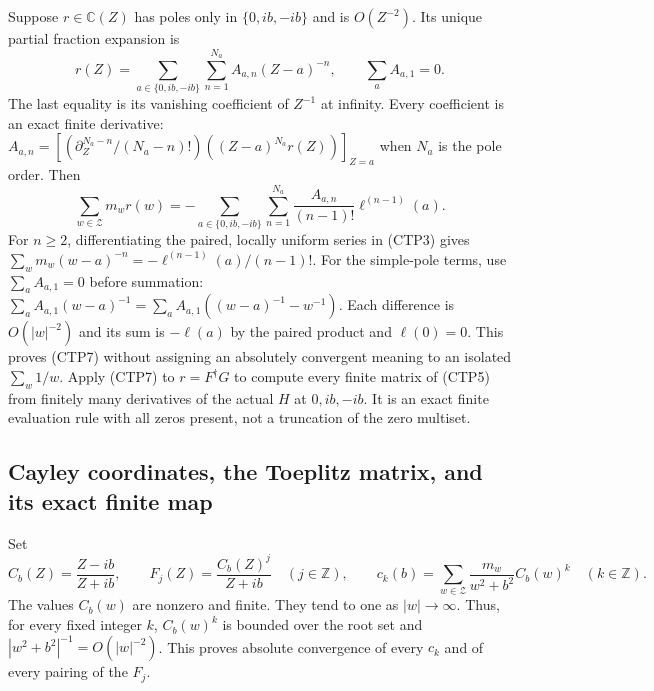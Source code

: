 Suppose $r\in\mathbb C(Z)$ has poles only in $\{0,ib,-ib\}$ and is
$O(Z^{-2})$. Its unique partial fraction expansion is
\begin{equation}\tag{CTP6}
 r(Z)=\sum_{a\in\{0,ib,-ib\}}\sum_{n=1}^{N_a}
                  A_{a,n}(Z-a)^{-n},\qquad
 \sum_a A_{a,1}=0.
\end{equation}
The last equality is its vanishing coefficient of $Z^{-1}$ at
infinity. Every coefficient is an exact finite derivative:
$A_{a,n}=\left[(\partial_Z^{N_a-n}/(N_a-n)!)
((Z-a)^{N_a}r(Z))\right]_{Z=a}$ when $N_a$ is the pole order.
Then
\begin{equation}\tag{CTP7}
 \sum_{w\in\mathcal Z}m_w r(w)
  =-\sum_{a\in\{0,ib,-ib\}}\sum_{n=1}^{N_a}
          \frac{A_{a,n}}{(n-1)!}\ell^{(n-1)}(a).
\end{equation}
For $n\ge2$, differentiating the paired, locally uniform series in
(CTP3) gives
$\sum_w m_w(w-a)^{-n}=-\ell^{(n-1)}(a)/(n-1)!$.
For the simple-pole terms, use $\sum_a A_{a,1}=0$ before summation:
$\sum_a A_{a,1}(w-a)^{-1}
=\sum_a A_{a,1}((w-a)^{-1}-w^{-1})$.
Each difference is $O(|w|^{-2})$ and its sum is $-\ell(a)$ by the
paired product and $\ell(0)=0$. This proves (CTP7) without assigning
an absolutely convergent meaning to an isolated $\sum_w1/w$.
Apply (CTP7) to $r=F^\dagger G$ to compute every finite matrix of
(CTP5) from finitely many derivatives of the actual $H$ at
$0,ib,-ib$. It is an exact finite evaluation rule with all zeros
present, not a truncation of the zero multiset.

\subsection{Cayley coordinates, the Toeplitz matrix, and its exact finite map}

Set
\begin{equation}\tag{CTP8}
 C_b(Z)=\frac{Z-ib}{Z+ib},\qquad
 F_j(Z)=\frac{C_b(Z)^j}{Z+ib}\quad(j\in\mathbb Z),\qquad
 c_k(b)=\sum_{w\in\mathcal Z}
               \frac{m_w}{w^2+b^2}C_b(w)^k\quad(k\in\mathbb Z).
\end{equation}
The values $C_b(w)$ are nonzero and finite. They tend to one as
$|w|\to\infty$. Thus, for every fixed integer $k$, $C_b(w)^k$ is
bounded over the root set and $|w^2+b^2|^{-1}=O(|w|^{-2})$.
This proves absolute convergence of every $c_k$ and of every
pairing of the $F_j$.

